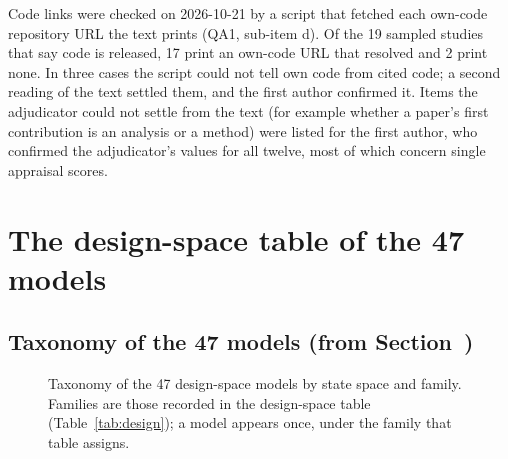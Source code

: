\documentclass[acmsmall,screen]{acmart}
\makeatletter
\newcommand{\Mref}[1]{\@ifundefined{mr@#1}{\textbf{??}}{\csname mr@#1\endcsname}}
\makeatother
\begin{document}
Code links were checked on 2026-10-21 by a script that fetched each own-code repository URL the text prints (QA1, sub-item d). Of the 19 sampled studies that say code is released, 17 print an own-code URL that resolved and 2 print none. In three cases the script could not tell own code from cited code; a second reading of the text settled them, and the first author confirmed it. Items the adjudicator could not settle from the text (for example whether a paper's first contribution is an analysis or a method) were listed for the first author, who confirmed the adjudicator's values for all twelve, most of which concern single appraisal scores. %

\section{The design-space table of the 47 models}
\label{sec:s-design}

\subsection{Taxonomy of the 47 models (from Section~\Mref{sec:intro})}
\label{sec:s-tree}

\begin{figure}[h]
\centering

\caption{Taxonomy of the 47 design-space models by state space and family. Families are those recorded in the design-space table (Table~\ref{tab:design}); a model appears once, under the family that table assigns.}
\label{fig:tree}
\end{figure}
\end{document}
